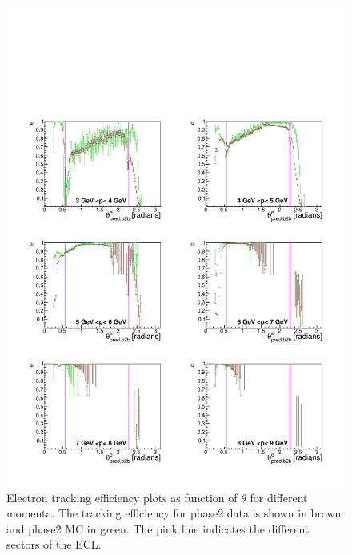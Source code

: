 \documentclass[a4paper,11pt,twosided,final,german,openbib,pdftex,listof=totoc,bibliography=totoc]{scrbook}
\begin{document}
\begin{figure}[!htbp]
	\centering
	\includegraphics[width=\textwidth]{Plots/master/xPMThetaem}
	\caption[Momentum $\theta$ Electron Efficiency Phase2]{Electron tracking efficiency plots as function of $\theta$ for different momenta. The tracking efficiency for phase2 data is shown in brown and phase2 MC in green. The pink line indicates the different sectors of the ECL.}
	
	\label{plt:xPMThetaem}
\end{figure}
\end{document}
